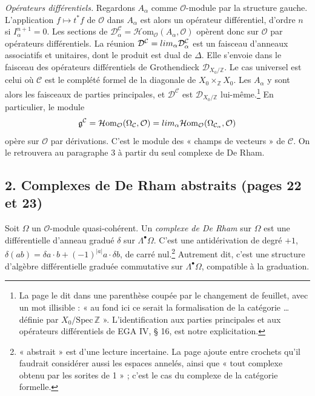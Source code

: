 \documentclass[11pt,a4paper]{article}
\begin{document}
\emph{Opérateurs différentiels.} Regardons $A_\alpha$ comme
$\mathcal{O}$-module par la structure gauche. L'application $f \mapsto t^{*}f$
de $\mathcal{O}$ dans $A_\alpha$ est alors un opérateur différentiel, d'ordre
$n$ si $I_\alpha^{n+1} = 0$. Les sections de
$\mathcal{D}^{\mathcal{C}}_\alpha =
\mathcal{H}\mathrm{om}_{\mathcal{O}}(A_\alpha, \mathcal{O})$ opèrent donc sur
$\mathcal{O}$ par opérateurs différentiels. La réunion
$\mathcal{D}^{\mathcal{C}} = \varinjlim_\alpha \mathcal{D}^{\mathcal{C}}_\alpha$
est un faisceau d'anneaux associatifs et unitaires, dont le produit est dual de
$\Delta$. Elle s'envoie dans le faisceau des opérateurs différentiels de
Grothendieck $\mathcal{D}_{X_0/\mathbb{Z}}$. Le cas universel est celui où
$\mathcal{C}$ est le complété formel de la diagonale de $X_0 \times_{\mathbb{Z}}
X_0$. Les $A_\alpha$ y sont alors les faisceaux de parties principales, et
$\mathcal{D}^{\mathcal{C}}$ est $\mathcal{D}_{X_0/\mathbb{Z}}$
lui-même.\footnote{La page le dit dans une parenthèse coupée par le changement
de feuillet, avec un mot illisible : « au fond ici ce serait la formalisation de
la catégorie … définie par $X_0/\mathrm{Spec}\,\mathbb{Z}$ ». L'identification
aux parties principales et aux opérateurs différentiels de EGA IV, § 16, est
notre explicitation.} En particulier, le module
\[
\mathfrak{g}^{\mathcal{C}} =
\mathcal{H}\mathrm{om}_{\mathcal{O}}(\Omega_{\mathcal{C}}, \mathcal{O})
= \varinjlim_\alpha \mathcal{H}\mathrm{om}_{\mathcal{O}}(\Omega_{\mathcal{C}_\alpha}, \mathcal{O})
\]
opère sur $\mathcal{O}$ par dérivations. C'est le module des « champs de
vecteurs » de $\mathcal{C}$. On le retrouvera au paragraphe 3 à partir du seul
complexe de De Rham.

\subsection*{2. Complexes de De Rham abstraits (pages 22 et 23)}

Soit $\Omega$ un $\mathcal{O}$-module quasi-cohérent. Un \emph{complexe de De Rham}
sur $\Omega$ est une différentielle d'anneau gradué $\delta$ sur
$\Lambda^{\bullet}\Omega$. C'est une antidérivation de degré $+1$,
$\delta(ab) = \delta a \cdot b + (-1)^{|a|} a \cdot \delta b$, de carré
nul.\footnote{« abstrait » est d'une lecture incertaine. La page ajoute entre
crochets qu'il faudrait considérer aussi les espaces annelés, ainsi que « tout
complexe obtenu par les sorites de 1 » ; c'est le cas du complexe de la
catégorie formelle.} Autrement dit, c'est une structure d'algèbre différentielle
graduée commutative sur $\Lambda^{\bullet}\Omega$, compatible à la graduation.
\end{document}
